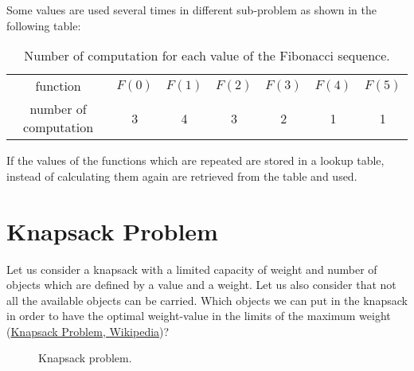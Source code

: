 Some values are used several times in different sub-problem as shown in the following table:
\begin{table}[H]
	\centering
	\begin{tabular}{c c c c c c c}
	function & $F(0)$ & $F(1)$ & $F(2)$ & $F(3)$ & $F(4)$ & $F(5)$ \\
	number of computation & 3 & 4 & 3 & 2 & 1 & 1
	\end{tabular}
	\caption[Number of computation for each value of the Fibonacci sequence.]{Number of computation for each value of the Fibonacci sequence.}
\end{table}
If the values of the functions which are repeated are stored in a lookup table, instead of calculating them again are retrieved from the table and used.

\section{Knapsack Problem}
Let us consider a knapsack with a limited capacity of weight and number of objects which are defined by a value and a weight. Let us also consider that not all the available objects can be carried. Which objects we can put in the knapsack in order to have the optimal weight-value in the limits of the maximum weight \cite{wikiknapsackproblem}(\href{https://en.wikipedia.org/wiki/Knapsack_problem}{Knapsack Problem, Wikipedia})?

\begin{figure}[H]
\centering
{}
\caption[Knapsack problem.]{Knapsack problem.}
\end{figure}

